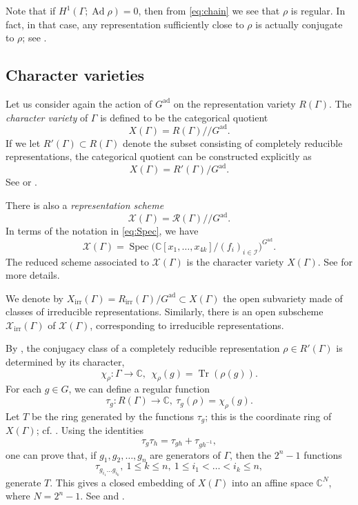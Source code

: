 \documentclass [11pt]{amsart}
\theoremstyle{remark}
\def\cc {{\mathbb{C}}}
\def\C{\cc}
\def\I {\mathcal{I}}
\def\sslash {/ \! /}
\def\Gad{G^{\operatorname{ad}}}
\def\Rep {R}
\def\RepIrr{R_{\operatorname{irr}}}
\def\Rs {\mathscr{R}}
\def\Ad {\operatorname{Ad}}
\def\Char {X}
\def\Chars {\mathscr{X} \!}
\def\CharIrr {\Char_{\operatorname{irr}}}
\def\CharsIrr {\mathscr{X}_{\operatorname{irr}}}
\def\tr {\operatorname{Tr }}
\begin{document}
Note that if $H^1(\Gamma; \Ad \rho)=0$, then from \eqref{eq:chain} we see that $\rho$ is regular. In fact, in that case, any representation sufficiently close to $\rho$ is actually conjugate to $\rho$; see \cite{Weil}.


\subsection{Character varieties}
Let us consider again the action of $\Gad$ on the representation variety $\Rep(\Gamma)$. The {\em character variety} of $\Gamma$ is defined to be the categorical quotient
$$ \Char(\Gamma) = \Rep(\Gamma) \sslash \Gad.$$
If we let $\Rep'(\Gamma) \subset \Rep(\Gamma)$ denote the subset consisting of completely reducible representations, the categorical quotient can be constructed explicitly as 
$$ \Char(\Gamma) =\Rep'(\Gamma)/\Gad.$$
See \cite[Theorem 1.27]{LubotzkyMagid} or \cite[Section 7]{Sikora}. 

There is also a {\em representation scheme} 
$$\Chars(\Gamma) = \Rs(\Gamma) \sslash \Gad.$$
In terms of the notation in \eqref{eq:Spec}, we have
$$\Chars(\Gamma) =   \operatorname{Spec} \bigl( \C[x_1, \dots, x_{4k}] / (f_i)_{i \in \I}  \bigr)^{\Gad}.$$
The reduced scheme associated to $\Chars(\Gamma)$ is the character variety $\Char(\Gamma)$. See \cite[Section 12]{Sikora} for more details.

We denote by $\CharIrr(\Gamma) = \RepIrr(\Gamma)/\Gad  \subset \Char(\Gamma)$ the open subvariety made of classes of irreducible representations. Similarly, there is an open subscheme $\CharsIrr(\Gamma)$ of $\Chars(\Gamma)$, corresponding to irreducible representations.

By \cite[Corollary 1.33]{LubotzkyMagid}, the conjugacy class of a completely reducible representation $\rho \in \Rep'(\Gamma)$ is determined by its character, 
$$\chi_{\rho}: \Gamma \to \C, \ \ \chi_{\rho}(g) = \tr(\rho(g)).$$
For each $g \in G$, we can define a regular function 
\begin{equation}
\label{eq:taug}
\tau_g: R(\Gamma) \to \C, \ \tau_g( \rho) = \chi_{\rho}(g).
\end{equation}
Let $T$ be the ring generated by the functions $\tau_g$; this is the coordinate ring of $ \Char(\Gamma)$; cf. \cite[1.31]{LubotzkyMagid}. Using the identities
$$ \tau_{g} \tau_h = \tau_{gh} + \tau_{gh^{-1}},$$ 
one can prove that, if $g_1, g_2, \dots, g_n$ are generators of $\Gamma$, then the $2^n-1$ functions 
$$ \tau_{g_{i_1} \dots g_{i_k}}, \ 1 \leq k \leq n, \ 1 \leq i_1 < \dots < i_k \leq n,$$  generate $T$. This gives a closed embedding of $\Char(\Gamma)$ into an affine space $\C^N$, where $N = 2^n-1$. See \cite[Proposition 1.4.1 and Corollary 1.4.5]{CullerShalen} and \cite[Proposition 4.4.2]{ShalenSurvey}.
\end{document}
